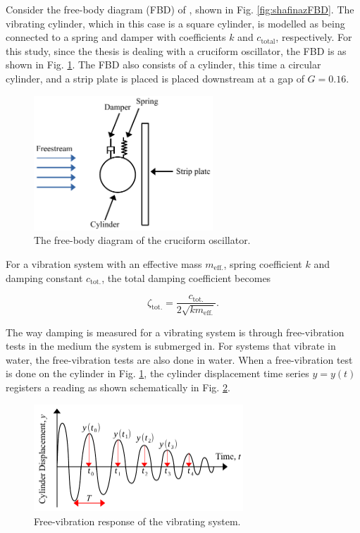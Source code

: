 \documentclass[oneside]{utmthesis}
\begin{document}
Consider the free-body diagram (FBD) of \citet{Maruai2019}, shown in Fig. \ref{fig:shafinazFBD}. The vibrating cylinder, which in this case is a square cylinder, is modelled as being connected to a spring and damper with coefficients $k$ and $c_{\text{total}}$, respectively. For this study, since the thesis is dealing with a cruciform oscillator, the FBD is as shown in Fig. \ref{fig:freeBodyDiagram}. The FBD also consists of a cylinder, this time a circular cylinder, and a strip plate is placed is placed downstream at a gap of $G=0.16$.

\begin{figure}[!h]
  \centering
  \hspace{1cm} \includegraphics[width=0.6\textwidth]{figs/freeBodyDiagram}
  \caption{The free-body diagram of the cruciform oscillator.}
  \label{fig:freeBodyDiagram}
\end{figure}

For a vibration system with an effective mass $m_{\text{eff.}}$, spring coefficient $k$ and damping constant $c_{\text{tot.}}$, the total damping coefficient becomes

\begin{equation}
  \zeta_{\text{tot.}} = \frac{c_{\text{tot.}}}{2 \sqrt{k m_{\text{eff.}}}}.
  \label{eq:zetaTotal}
\end{equation}

\noindent The way damping is measured for a vibrating system is through free-vibration tests \citep{Sinha2010} in the medium the system is submerged in. For systems that vibrate in water, the free-vibration tests are also done in water. When a free-vibration test is done on the cylinder in Fig. \ref{fig:freeBodyDiagram}, the cylinder displacement time series $y=y(t)$ registers a reading as shown schematically in Fig. \ref{fig:freeVibration}.

\begin{figure}[!h]
  \centering
  \hspace{1cm} \includegraphics[width=0.7\textwidth]{figs/freeVibration}
  \caption{Free-vibration response of the vibrating system.}
  \label{fig:freeVibration}
\end{figure}
\end{document}
